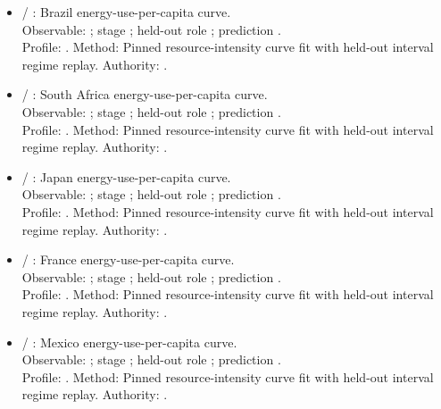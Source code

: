 \begin{itemize}
\item {} / : Brazil energy-use-per-capita curve.\\ Observable: ; stage ; held-out role ; prediction .\\ Profile: . Method: Pinned resource-intensity curve fit with held-out interval regime replay. Authority: .
\item {} / : South Africa energy-use-per-capita curve.\\ Observable: ; stage ; held-out role ; prediction .\\ Profile: . Method: Pinned resource-intensity curve fit with held-out interval regime replay. Authority: .
\item {} / : Japan energy-use-per-capita curve.\\ Observable: ; stage ; held-out role ; prediction .\\ Profile: . Method: Pinned resource-intensity curve fit with held-out interval regime replay. Authority: .
\item {} / : France energy-use-per-capita curve.\\ Observable: ; stage ; held-out role ; prediction .\\ Profile: . Method: Pinned resource-intensity curve fit with held-out interval regime replay. Authority: .
\item {} / : Mexico energy-use-per-capita curve.\\ Observable: ; stage ; held-out role ; prediction .\\ Profile: . Method: Pinned resource-intensity curve fit with held-out interval regime replay. Authority: .

\end{itemize}
